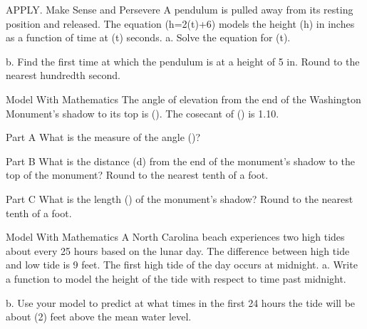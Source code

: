 \documentclass{article}
\newenvironment{practice}[2]{}{}        %
\newcommand{\answer}[1]{}               %
\newcommand{\placeholder}[2]{}          %
\newcommand{\te}[1]{}                   %
\begin{document}
\begin{practice}{33}{2}
APPLY. Make Sense and Persevere A pendulum is pulled away from its resting position and released. The equation (h=2\cos(\pi t)+6) models the height (h) in inches as a function of time at (t) seconds.
a. Solve the equation for (t).
\answer{a. (t=\frac1\pi\cos^{-1}(\frac{h-6}2))}
b. Find the first time at which the pendulum is at a height of 5 in. Round to the nearest hundredth second.
\answer{b.0.67 s}
\end{practice}
\begin{practice}{34}{3}
Model With Mathematics The angle of elevation from the end of the Washington Monument's shadow to its top is (\theta). The cosecant of (\theta) is 1.10.
\placeholder{photo}{AerialWashingtonMonumentphotograph withwhiteoverlaidrighttriangle,verticalmonumentleg555ft,slopinghypotenused,groundshadowell,thetaatshadowendpointlowerleft,rightangleatmonumentbase.}
Part A What is the measure of the angle (\theta)?
\answer{a. (\theta=65.4°)}
Part B What is the distance (d) from the end of the monument's shadow to the top of the monument? Round to the nearest tenth of a foot.
\answer{b. (d=610.5\text{ ft})}
Part C What is the length (\ell) of the monument's shadow? Round to the nearest tenth of a foot.
\answer{c. (\ell=254.3\text{ ft})}
\end{practice}
\begin{practice}{35}{2}
Model With Mathematics A North Carolina beach experiences two high tides about every 25 hours based on the lunar day. The difference between high tide and low tide is 9 feet. The first high tide of the day occurs at midnight.
a. Write a function to model the height of the tide with respect to time past midnight.
\answer{a. (h=4.5\cos\frac{2\pi}{25}t), where h is the height of the tide and t is the number of hours past midnight.}
b. Use your model to predict at what times in the first 24 hours the tide will be about (2) feet above the mean water level.
\answer{b.3:54 A.M. and 9:06 P.M.}
\te{Printed model has a 25-hour period although the prompt says two high tides per25 hours; likely period 12.5 hours and corresponding additional times are intended.}
\end{practice}
\end{document}
